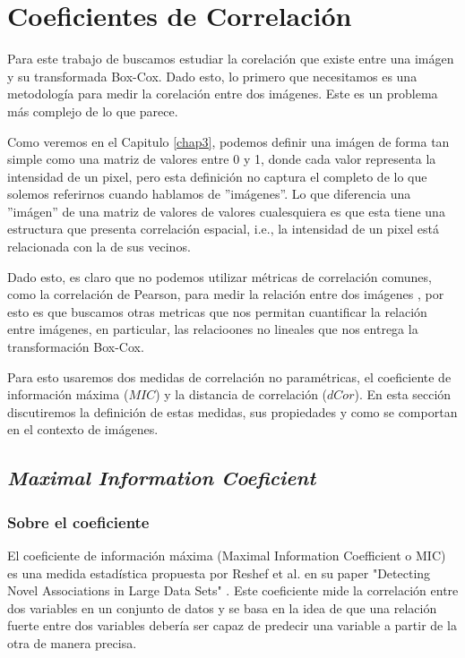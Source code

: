 \chapter{Coeficientes de Correlaci\'on}\label{chap2}
        
    Para este trabajo de buscamos estudiar la corelaci\'on que existe entre una im\'agen y su transformada Box-Cox. Dado esto, lo primero que necesitamos es una metodolog\'ia para medir la corelaci\'on entre dos im\'agenes. Este es un problema m\'as complejo de lo que parece. 

    Como veremos en el Capitulo \ref{chap3}, podemos definir una im\'agen de forma tan simple como una matriz de valores entre 0 y 1, donde cada valor representa la intensidad de un pixel, pero esta definici\'on no captura el completo de lo que solemos referirnos cuando hablamos de ''im\'agenes''. Lo que diferencia una ''im\'agen'' de una matriz de valores de valores cualesquiera es que esta tiene una estructura que presenta correlaci\'on espacial, i.e., la intensidad de un pixel est\'a relacionada con la de sus vecinos.

    Dado esto, es claro que no podemos utilizar m\'etricas de correlaci\'on comunes, como la correlaci\'on de Pearson, para medir la relaci\'on entre dos im\'agenes \cite{personbad}, por esto es que buscamos otras metricas que nos permitan cuantificar la relaci\'on entre im\'agenes, en particular, las relacioones no lineales que nos entrega la transformaci\'on Box-Cox.

    Para esto usaremos dos medidas de correlaci\'on no param\'etricas, el coeficiente de informaci\'on m\'axima ($MIC$) y la distancia de correlaci\'on ($dCor$). En esta secci\'on discutiremos la definici\'on de estas medidas, sus propiedades y como se comportan en el contexto de im\'agenes.

    \section{\textit{Maximal Information Coeficient}} 
    
    \subsection{Sobre el coeficiente}
    
        El coeficiente de informaci\'on m\'axima (Maximal Information Coefficient o MIC) es una medida estad\'istica propuesta por Reshef et al. en su paper "Detecting Novel Associations in Large Data Sets" \cite{Reshef2011}. Este coeficiente mide la correlaci\'on entre dos variables en un conjunto de datos y se basa en la idea de que una relaci\'on fuerte entre dos variables deber\'ia ser capaz de predecir una variable a partir de la otra de manera precisa.
    
